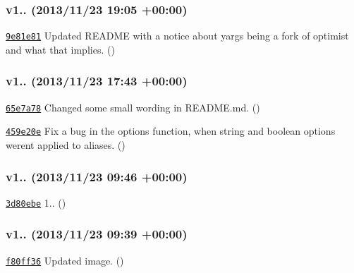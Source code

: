 \subsubsection*{v1.. (2013/11/23 19\+:05 +00\+:00)}


\begin{DoxyItemize}
\item \href{https://github.com/bcoe/yargs/commit/9e81e81654028f83ba86ffc3ac772a0476084e5e}{\tt 9e81e81} Updated R\+E\+A\+D\+ME with a notice about yargs being a fork of optimist and what that implies. ()
\end{DoxyItemize}

\subsubsection*{v1.. (2013/11/23 17\+:43 +00\+:00)}


\begin{DoxyItemize}
\item \href{https://github.com/bcoe/yargs/commit/65e7a782c86764944d63d084416aba9ee6019c5f}{\tt 65e7a78} Changed some small wording in R\+E\+A\+D\+M\+E.\+md. ()
\item \href{https://github.com/bcoe/yargs/commit/459e20e539b366b85128dd281ccd42221e96c7da}{\tt 459e20e} Fix a bug in the options function, when string and boolean options weren\textquotesingle{}t applied to aliases. ()
\end{DoxyItemize}

\subsubsection*{v1.. (2013/11/23 09\+:46 +00\+:00)}


\begin{DoxyItemize}
\item \href{https://github.com/bcoe/yargs/commit/3d80ebed866d3799224b6f7d596247186a3898a9}{\tt 3d80ebe} 1.. ()
\end{DoxyItemize}

\subsubsection*{v1.. (2013/11/23 09\+:39 +00\+:00)}


\begin{DoxyItemize}
\item \href{https://github.com/bcoe/yargs/commit/f80ff3642d580d4b68bf9f5a94277481bd027142}{\tt f80ff36} Updated image. ()
\end{DoxyItemize}

